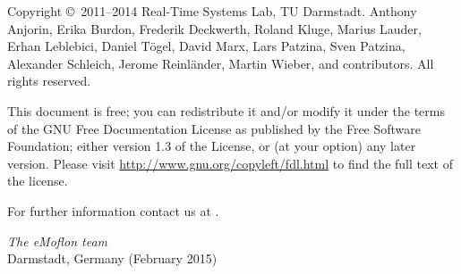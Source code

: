 \begin{small} 
Copyright \copyright~2011--2014 Real-Time Systems Lab, TU Darmstadt.
Anthony Anjorin, Erika Burdon, Frederik Deckwerth, Roland Kluge, Marius Lauder,
Erhan Leblebici, Daniel T\"ogel, David Marx, Lars Patzina, Sven Patzina, Alexander
Schleich, Jerome Reinl\"ander, Martin Wieber, and contributors.
All rights reserved.

This document is free; you can redistribute it and/or modify it under the terms of the GNU Free Documentation License as published by the Free Software Foundation; either version 1.3 of the License, or (at your option) any later version.
Please visit \href{http://www.gnu.org/copyleft/fdl.html}{http://www.gnu.org/copyleft/fdl.html} to find the full text of the license.
 
  
For further information contact us at \eMoflonContact.
  
\vskip3cm
\textit{The eMoflon team}\\
Darmstadt, Germany (February 2015)
\end{small}